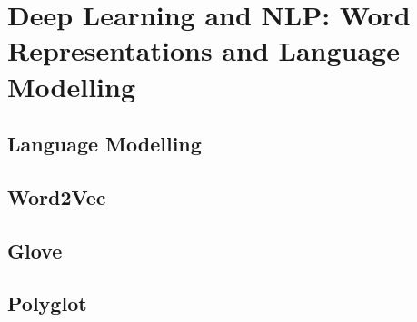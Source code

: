 \chapter{Deep Learning and NLP: Word Representations and Language Modelling}\label{chapter:deepnlp}

\section{Language Modelling}
\section{Word2Vec}
\section{Glove}
\section{Polyglot}